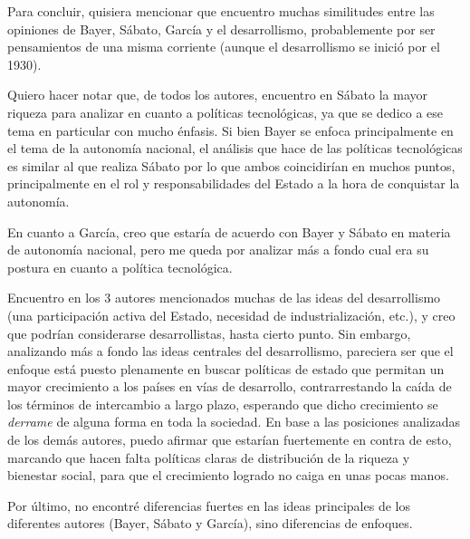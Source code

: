 Para concluir, quisiera mencionar que encuentro muchas similitudes entre las opiniones de Bayer, Sábato, García y el desarrollismo, probablemente por ser pensamientos de una misma corriente (aunque el desarrollismo se inició por el 1930).

Quiero hacer notar que, de todos los autores, encuentro en Sábato la mayor riqueza para analizar en cuanto a políticas tecnológicas, ya que se dedico a ese tema en particular con mucho énfasis. Si bien Bayer se enfoca principalmente en el tema de la autonomía nacional, el análisis que hace de las políticas tecnológicas es similar al que realiza Sábato por lo que ambos coincidirían en muchos puntos, principalmente en el rol y responsabilidades del Estado a la hora de conquistar la autonomía.

En cuanto a García, creo que estaría de acuerdo con Bayer y Sábato en materia de autonomía nacional, pero me queda por analizar más a fondo cual era su postura en cuanto a política tecnológica.

Encuentro en los 3 autores mencionados muchas de las ideas del desarrollismo (una participación activa del Estado, necesidad de industrialización, etc.), y creo que podrían considerarse desarrollistas, hasta cierto punto.
Sin embargo, analizando más a fondo las ideas centrales del desarrollismo, pareciera ser que el enfoque está puesto plenamente en buscar políticas de estado que permitan un mayor crecimiento a los países en vías de desarrollo, contrarrestando la caída de los términos de intercambio a largo plazo, esperando que dicho crecimiento se \textit{derrame} de alguna forma en toda la sociedad. En base a las posiciones analizadas de los demás autores, puedo afirmar que estarían fuertemente en contra de esto, marcando que hacen falta políticas claras de distribución de la riqueza y bienestar social, para que el crecimiento logrado no caiga en unas pocas manos.

Por último, no encontré diferencias fuertes en las ideas principales de los diferentes autores (Bayer, Sábato y García), sino diferencias de enfoques.
